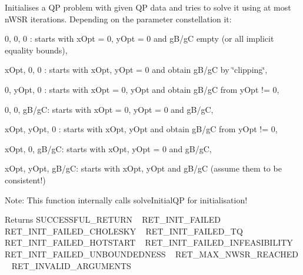 Initialises a QP problem with given QP data and tries to solve it using at most n\+W\+SR iterations. Depending on the parameter constellation it\+: ~\newline

\begin{DoxyEnumerate}
\item 0, 0, 0 \+: starts with x\+Opt = 0, y\+Opt = 0 and g\+B/gC empty (or all implicit equality bounds), ~\newline

\item x\+Opt, 0, 0 \+: starts with x\+Opt, y\+Opt = 0 and obtain g\+B/gC by \char`\"{}clipping\char`\"{}, ~\newline

\item 0, y\+Opt, 0 \+: starts with x\+Opt = 0, y\+Opt and obtain g\+B/gC from y\+Opt != 0, ~\newline

\item 0, 0, g\+B/gC\+: starts with x\+Opt = 0, y\+Opt = 0 and g\+B/gC, ~\newline

\item x\+Opt, y\+Opt, 0 \+: starts with x\+Opt, y\+Opt and obtain g\+B/gC from y\+Opt != 0, ~\newline

\item x\+Opt, 0, g\+B/gC\+: starts with x\+Opt, y\+Opt = 0 and g\+B/gC, ~\newline

\item x\+Opt, y\+Opt, g\+B/gC\+: starts with x\+Opt, y\+Opt and g\+B/gC (assume them to be consistent!)
\end{DoxyEnumerate}

Note\+: This function internally calls solve\+Initial\+QP for initialisation!

\begin{DoxyReturn}{Returns}
S\+U\+C\+C\+E\+S\+S\+F\+U\+L\+\_\+\+R\+E\+T\+U\+RN ~\newline
 R\+E\+T\+\_\+\+I\+N\+I\+T\+\_\+\+F\+A\+I\+L\+ED ~\newline
 R\+E\+T\+\_\+\+I\+N\+I\+T\+\_\+\+F\+A\+I\+L\+E\+D\+\_\+\+C\+H\+O\+L\+E\+S\+KY ~\newline
 R\+E\+T\+\_\+\+I\+N\+I\+T\+\_\+\+F\+A\+I\+L\+E\+D\+\_\+\+TQ ~\newline
 R\+E\+T\+\_\+\+I\+N\+I\+T\+\_\+\+F\+A\+I\+L\+E\+D\+\_\+\+H\+O\+T\+S\+T\+A\+RT ~\newline
 R\+E\+T\+\_\+\+I\+N\+I\+T\+\_\+\+F\+A\+I\+L\+E\+D\+\_\+\+I\+N\+F\+E\+A\+S\+I\+B\+I\+L\+I\+TY ~\newline
 R\+E\+T\+\_\+\+I\+N\+I\+T\+\_\+\+F\+A\+I\+L\+E\+D\+\_\+\+U\+N\+B\+O\+U\+N\+D\+E\+D\+N\+E\+SS ~\newline
 R\+E\+T\+\_\+\+M\+A\+X\+\_\+\+N\+W\+S\+R\+\_\+\+R\+E\+A\+C\+H\+ED ~\newline
 R\+E\+T\+\_\+\+I\+N\+V\+A\+L\+I\+D\+\_\+\+A\+R\+G\+U\+M\+E\+N\+TS 
\end{DoxyReturn}

